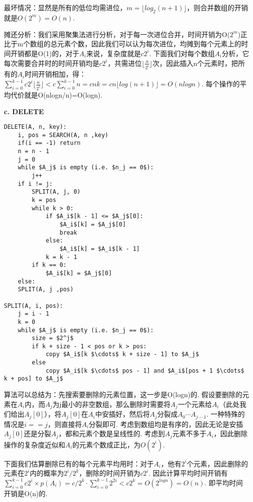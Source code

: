 \documentclass[UTF8]{ctexart}
\begin{document}
最坏情况：显然是所有的低位均需进位，$m=\lfloor{log_2(n+1)}\rfloor$，则合并数组的开销就是$O(2^m)=O(n)$.\par
摊还分析：我们采用聚集法进行分析，对于每一次进位合并，时间开销为O($2^m$)正比于m个数组的总元素个数，因此我们可以认为每次进位，均摊到每个元素上的时间开销都是O(1)的，对于$A_i$来说，复杂度就是$c2^i$. 下面我们对每个数组$A_i$分析，它每次需要合并时的时间开销均是$c2^i$，共需进位$\lfloor\frac{n}{2^i}\rfloor$次，因此插入n个元素时，把所有的$A_i$时间开销相加，得：$\sum_{i=0}^{k-1}c2^i\lfloor\frac{n}{2^i}\rfloor<c\sum_{i=0}^{k-1}n=cnk=cn\lfloor log(n+1)\rfloor=O(nlogn)$. 每个操作的平均代价就是O(nlogn/n)=O(logn).\par
\textbf{c. DELETE}\par
\begin{lstlisting}[mathescape = true]
DELETE(A, n, key):
    i, pos = SEARCH(A, n ,key)
    if(i == -1) return
    n = n - 1
    j = 0
    while $A_j$ is empty (i.e. $n_j == 0$):
        j++
    if i != j:
        SPLIT(A, j, 0)
        k = pos
        while k > 0:
            if $A_i$[k - 1] <= $A_j$[0]:
                $A_i$[k] = $A_j$[0]
                break
            else:
                $A_i$[k] = $A_i$[k - 1]
            k = k - 1
        if k == 0:
            $A_i$[k] = $A_j$[0]
    else:
    SPLIT(A, j ,pos)

SPLIT(A, i, pos):
    j = i - 1
    k = 0
    while $A_j$ is empty (i.e. $n_j == 0$):
        size = $2^j$
        if k + size - 1 < pos or k > pos:
            copy $A_i$[k $\cdots$ k + size - 1] to $A_j$
        else 
            copy $A_i$[k $\cdots$ pos - 1] and $A_i$[pos + 1 $\cdots$ k + pos] to $A_j$
\end{lstlisting}\par
算法可以总结为：先搜索要删除的元素位置，这一步是O(logn)的. 假设要删除的元素在$A_i$内，而$A_j$为j最小的非空数组，那么删除时需要将$A_j$一个元素给$A_i$（此处我们给出$A_j[0]$），将$A_j[0]$在$A_i$中安插好，然后将$A_j$分裂成$A_0\cdots A_{j-1}$. 一种特殊的情况是$i == j$，则直接将$A_i$分裂即可. 考虑到数组均是有序的，因此无论是安插$A_j[0]$还是分裂$A_j$，都和元素个数是呈线性的. 考虑到$A_j$元素不多于$A_i$，因此删除操作的复杂度近似和$A_i$的元素个数成正比，为$O(2^i)$.\par
下面我们估算删除已有的每个元素平均用时：对于$A_i$，他有$2^i$个元素，因此删除的元素在$2^i$内的概率为$2^i/2^k$，删除的时间开销为$c2^i$. 因此计算平均时间开销有$\sum_{i=0}^{k-1}c2^i\times p(A_i)=c/2^k\cdot\sum_{i=0}^{k-1}2^{2i}<c2^k=O(2^{logn})=O(n)$. 即平均时间开销是O(n)的.
\end{document}
